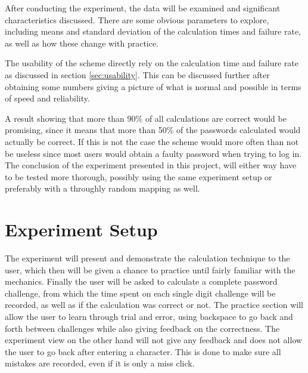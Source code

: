 \par After conducting the experiment, the data will be examined and significant characteristics discussed. There are some obvious parameters to explore, including means and standard deviation of the calculation times and failure rate, as well as how these change with practice. 

\par The usability of the scheme directly rely on the calculation time and failure rate as discussed in section \ref{sec:usability}. This can be discussed further after obtaining some numbers giving a picture of what is normal and possible in terms of speed and reliability.
\par A result showing that more than 90\% of all calculations are correct would be promising, since it means that more than 50\% of the passwords calculated would actually be correct. If this is not the case the scheme would more often than not be useless since most users would obtain a faulty password when trying to log in. The conclusion of the experiment presented in this project, will either way have to be tested more thorough, possibly using the same experiment setup or preferably with a throughly random mapping as well. 



\section{Experiment Setup}
The experiment will present and demonstrate the calculation technique to the user, which then will be given a chance to practice until fairly familiar with the mechanics. Finally the user will be asked to calculate a complete password challenge, from which the time spent on each single digit challenge will be recorded, as well as if the calculation was correct or not. The practice section will allow the user to learn through trial and error, using backspace to go back and forth between challenges while also giving feedback on the correctness. The experiment view on the other hand will not give any feedback and does not allow the user to go back after entering a character. This is done to make sure all mistakes are recorded, even if it is only a miss click. 
